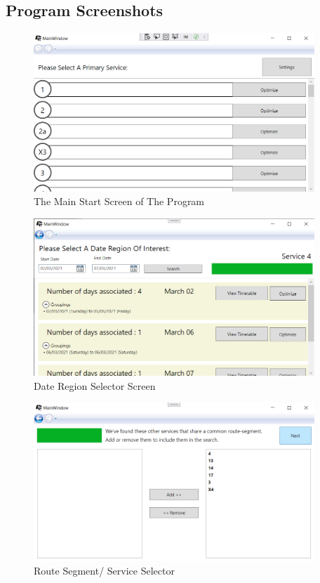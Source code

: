 \documentclass{article}
\begin{document}
\subsection{Program Screenshots}
\label{screenshots}
\begin{figure}[H]
	\centering
	\includegraphics[width=400px]{images/mainPage.PNG}
	\caption{The Main Start Screen of The Program}
	\label{fig:mainPage}
\end{figure}

\begin{figure}[H]
	\centering
	\includegraphics[width=400px]{images/dateTimeSelector.PNG}
	\caption{Date Region Selector Screen}
	\label{fig:dateSelector}
\end{figure}

\begin{figure}[H]
	\centering
	\includegraphics[width=400px]{images/routesegment.PNG}
	\caption{Route Segment/ Service Selector}
	\label{fig:routeSegmentSelector}
\end{figure}
\end{document}
